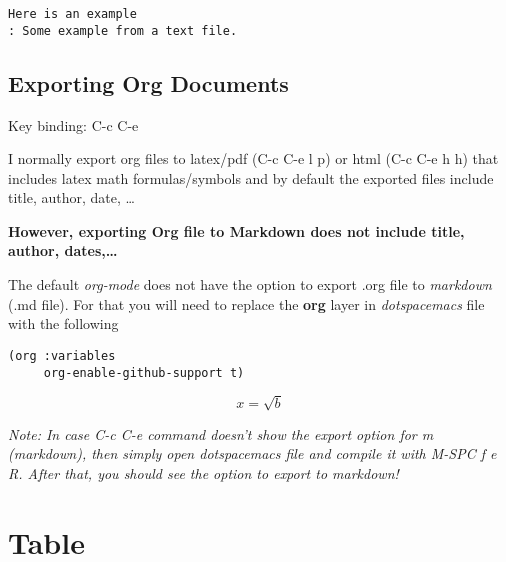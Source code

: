 \documentclass[11pt]{article}
\begin{document}
\begin{verbatim}
Here is an example
: Some example from a text file. 
\end{verbatim}

\subsection{Exporting Org Documents}
\label{sec:org740874c}

Key binding: C-c C-e 

I normally export org files to latex/pdf (C-c C-e l p) or html (C-c C-e h h) that includes latex math formulas/symbols and by default the exported files include title, author, date, \ldots{}  

\textbf{However, exporting Org file to Markdown does not include title, author, dates,\ldots{}} 

The default \emph{org-mode} does not have the option to export .org file to \emph{markdown} (.md file).   For that you will need to replace the \textbf{org} layer in \emph{dotspacemacs} file   with the   following 

\begin{verbatim}
(org :variables
     org-enable-github-support t)
\end{verbatim}


$$x = \sqrt{b}$$


\emph{Note: In case C-c C-e command doesn't show the export option for m (markdown), then simply open dotspacemacs file and compile it with M-SPC f e R. After that, you should see the option to export to markdown!} 

\section{Table}
\label{sec:org4b9a296}
\end{document}
